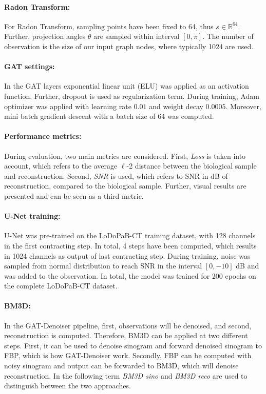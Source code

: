 \paragraph{Radon Transform:}
For Radon Transform, sampling points have been fixed to 64, thus $s \in \mathbb{R}^{64}$.
Further, projection angles $\theta$ are sampled within interval $[0, \pi]$.
The number of observation is the size of our input graph nodes, where typically 1024 are used.

\paragraph{GAT settings:}
In the GAT layers exponential linear unit (ELU) was applied as an activation function.
Further, dropout is used as regularization term.
During training, Adam~\cite{adam} optimizer was applied with learning rate $0.01$ and weight decay $0.0005$.
Moreover, mini batch gradient descent with a batch size of 64 was computed.

\paragraph{Performance metrics:}
During evaluation, two main metrics are considered.
First, \textit{Loss} is taken into account, which refers to the average $\ell$-2 distance between the biological sample and reconstruction.
Second, \textit{SNR} is used, which refers to SNR in dB of reconstruction, compared to the biological sample.
Further, visual results are presented and can be seen as a third metric.


\paragraph{U-Net training:}
U-Net was pre-trained on the LoDoPaB-CT training dataset, with 128 channels in the first contracting step. 
In total, 4 steps have been computed, which results in 1024 channels as output of last contracting step.
During training, noise was sampled from normal distribution to reach SNR in the interval $[0, -10]$ dB 
and was added to the observation. In total, the model was trained for 200 epochs on the complete LoDoPaB-CT dataset.

\paragraph{BM3D:}
In the GAT-Denoiser pipeline, first, observations will be denoised, and second, reconstruction is computed.
Therefore, BM3D can be applied at two different steps. First, it can be used to denoise sinogram
and forward denoised sinogram to FBP, which is how GAT-Denoiser work. Secondly, FBP can be
computed with noisy sinogram and output can be forwarded to BM3D, which will denoise reconstruction.
In the following term \textit{BM3D sino} and \textit{BM3D reco} are used to distinguish between the two approaches.

